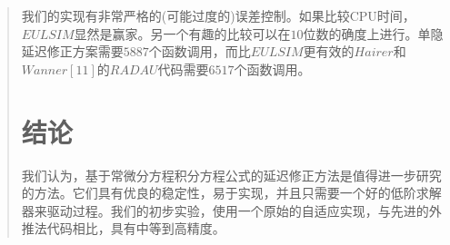 \documentclass{article}
\begin{document}
\begin{CJK}{UTF8}{gkai}
\begin{quotation}
我们的实现有非常严格的(可能过度的)误差控制。如果比较CPU时间，$EULSIM$显然是赢家。另一个有趣的比较可以在$10$位数的确度上进行。单隐延迟修正方案需要$5887$个函数调用，而比$EULSIM$更有效的$Hairer$和$Wanner[11]$的$RADAU$代码需要$6517$个函数调用。\\
\section{结论}

我们认为，基于常微分方程积分方程公式的延迟修正方法是值得进一步研究的方法。它们具有优良的稳定性，易于实现，并且只需要一个好的低阶求解器来驱动过程。我们的初步实验，使用一个原始的自适应实现，与先进的外推法代码相比，具有中等到高精度。\\
\end{quotation}
\end{CJK}
\end{document}
